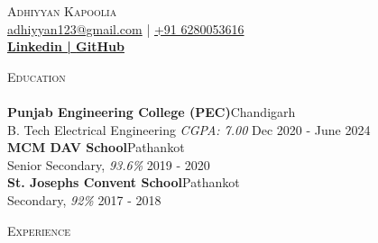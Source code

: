 \documentclass[a4paper]{article}
\newcommand{\lineunder} {
    \vspace*{-8pt} \\
    \hspace*{-18pt} \hrulefill \\
}
\newcommand{\header} [1] {
    {\hspace*{-18pt}\vspace*{6pt} \textsc{#1}}
    \vspace*{-6pt} \lineunder
}
\begin{document}
    \vspace*{-40pt}

    

%
%
  \vspace*{-2pt}
  \begin{center}
    {\Huge \scshape {Adhiyyan Kapoolia}}\\
    \vspace*{2pt}
    \href{mailto:adhiyyan123@gmail.com}{adhiyyan123@gmail.com} | \href{tel:+91 6280053616}{+91 6280053616}\\
    \vspace*{2pt}
    \textbf{\href{https://www.linkedin.com/in/adhiyyan/}{Linkedin | }}\textbf{\href{https://github.com/adhiyyan}{GitHub}}\\
  \end{center}

      \header{Education}
      \vspace{2mm}
      \textbf{Punjab Engineering College (PEC)}\hfill Chandigarh\\
B. Tech Electrical Engineering \textit{CGPA: 7.00} \hfill Dec 2020 - June 2024\\
\vspace{2mm}
      \textbf{MCM DAV School}\hfill Pathankot\\
Senior Secondary, \textit{93.6\%} \hfill 2019 - 2020\\
\vspace{2mm}
      \textbf{St. Joseph\textquotesingle{}s Convent School}\hfill Pathankot\\
Secondary, \textit{92\%} \hfill 2017 - 2018\\
\vspace{2mm}

      \header{Experience}
      \vspace{2mm}
\end{document}
